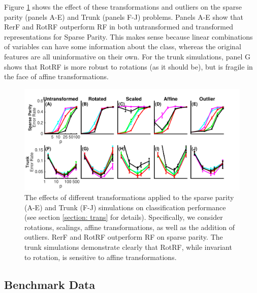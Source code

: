 \documentclass[10pt]{article}
\begin{document}
Figure \ref{transformations} shows the effect of these transformations and outliers on the sparse parity (panels A-E) and Trunk (panels F-J) problems. Panels A-E show that RerF and RotRF outperform RF in both untransformed and transformed representations for Sparse Parity. This makes sense because linear combinations of variables can have some information about the class, whereas the original features are all uninformative on their own. For the trunk simulations, panel G shows that RotRF is more robust to rotations (as it should be), but is fragile in the face of affine transformations.

\begin{figure}[ht]
\vskip 0.2in
\begin{center}
\centerline{\includegraphics[width=\columnwidth]{../../Figures/pdf/Fig3_transformations2}}
\caption{The effects of different transformations applied to the sparse parity (A-E) and Trunk (F-J) simulations on classification performance (see section \ref{section: trans} for details). Specifically, we consider rotations, scalings, affine transformations, as well as the addition of outliers. RerF and RotRF outperform RF on sparse parity. The trunk simulations demonstrate clearly that RotRF, while invariant to rotation, is sensitive to affine transformations.}
\label{transformations}
\end{center}
\vskip -0.2in
\end{figure}

\subsection{Benchmark Data}
\label{section: benchmark}
\end{document}
